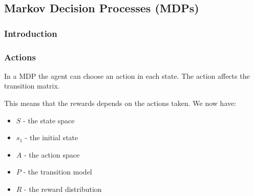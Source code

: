 \subsection{Markov Decision Processes (MDPs)}

\subsubsection{Introduction}

\subsubsection{Actions}

In a MDP the agent can choose an action in each state. The action affects the transition matrix.

This means that the rewards depends on the actions taken. We now have:

\begin{itemize}
\item \(S\) - the state space
\item \(s_1\) - the initial state
\item \(A\) - the action space
\item \(P\) - the transition model
\item \(R\) - the reward distribution
\end{itemize}

